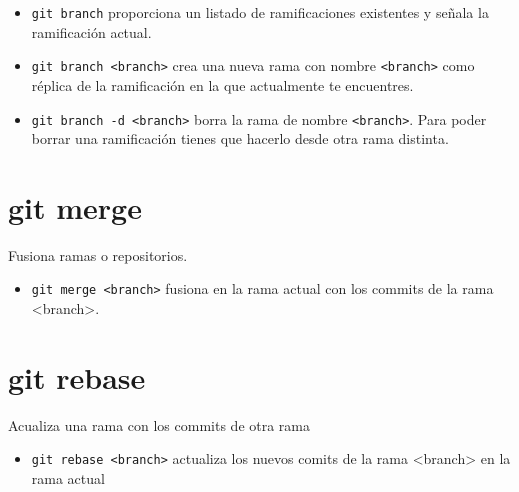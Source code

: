 \documentclass[a4paper,11pt]{report}
\newcommand{\cverb}{\Verb}
\begin{document}
      \begin{itemize}
       \item \cverb+git branch+ proporciona un listado de ramificaciones existentes y señala la ramificación actual.
       \item \cverb+git branch <branch>+ crea una nueva rama con nombre \verb+<branch>+ como réplica de la ramificación en la que actualmente te encuentres.
       \item \cverb+git branch -d <branch>+ borra la rama de nombre \verb+<branch>+. Para poder borrar una ramificación tienes que hacerlo desde otra rama distinta.
      \end{itemize}
    
    \section{git merge}
	    Fusiona ramas o repositorios.
	    \begin{itemize}
       \item \cverb+git merge <branch>+ fusiona en la rama actual con los commits de la rama <branch>.
      \end{itemize}
    
    \section{git rebase}
					Acualiza una rama con los commits de otra rama
	    \begin{itemize}
      \item \cverb+git rebase <branch>+ actualiza los nuevos comits de la rama <branch> en la rama actual
      \end{itemize}

 
\end{document}
